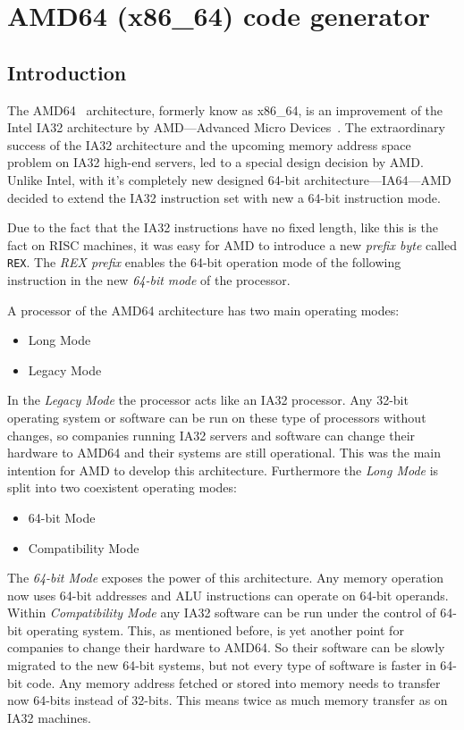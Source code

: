 \section{AMD64 (x86\_64) code generator}

\subsection{Introduction}

The AMD64~\cite{AMD64} architecture, formerly know as x86\_64, is an
improvement of the Intel IA32 architecture by AMD---Advanced Micro
Devices~\cite{AMD}. The extraordinary success of the IA32 architecture
and the upcoming memory address space problem on IA32 high-end
servers, led to a special design decision by AMD. Unlike Intel, with
it's completely new designed 64-bit architecture---IA64---AMD decided
to extend the IA32 instruction set with new a 64-bit instruction mode.

Due to the fact that the IA32 instructions have no fixed length, like
this is the fact on RISC machines, it was easy for AMD to introduce a
new \textit{prefix byte} called \texttt{REX}. The \textit{REX prefix}
enables the 64-bit operation mode of the following instruction in the
new \textit{64-bit mode} of the processor.

A processor of the AMD64 architecture has two main operating modes:

\begin{itemize}
\item Long Mode
\item Legacy Mode
\end{itemize}

In the \textit{Legacy Mode} the processor acts like an IA32
processor. Any 32-bit operating system or software can be run on these
type of processors without changes, so companies running IA32 servers
and software can change their hardware to AMD64 and their systems are
still operational. This was the main intention for AMD to develop this
architecture. Furthermore the \textit{Long Mode} is split into two
coexistent operating modes:

\begin{itemize}
\item 64-bit Mode
\item Compatibility Mode
\end{itemize}

The \textit{64-bit Mode} exposes the power of this architecture. Any
memory operation now uses 64-bit addresses and ALU instructions can
operate on 64-bit operands. Within \textit{Compatibility Mode} any
IA32 software can be run under the control of 64-bit operating
system. This, as mentioned before, is yet another point for companies
to change their hardware to AMD64. So their software can be slowly
migrated to the new 64-bit systems, but not every type of software is
faster in 64-bit code. Any memory address fetched or stored into
memory needs to transfer now 64-bits instead of 32-bits. This means
twice as much memory transfer as on IA32 machines.

